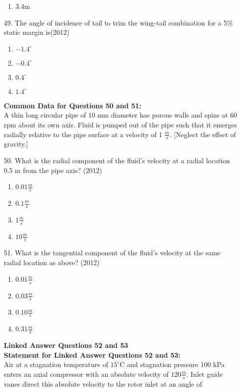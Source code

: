 \documentclass[journal]{IEEEtran}
\begin{document}
\begin{enumerate}
\begin{enumerate}[label=(\Alph*)]
        \item 3.4m
    \end{enumerate}
    \item[49.] The angle of incidence of tail to trim the wing-tail combination for a 5\% static margin is\hfill (2012) 
     \begin{enumerate}[label=(\Alph*)]
        \item $-1.4^{\circ}$
        \item $-0.4^{\circ}$
        \item $0.4^{\circ}$
        \item $1.4^{\circ}$
     \end{enumerate}
     \textbf{Common Data for Questions 50 and 51:}\\
     A thin long circular pipe of 10 mm diameter has porous walls and spins at 60 rpm about its own axis. Fluid
     is pumped out of the pipe such that it emerges radially relative to the pipe surface at a velocity of 1 $\frac{m}{s}$.
     [Neglect the effect of gravity.] 
    \item[50.] What is the radial component of the fluid's velocity at a radial location 0.5 m from the pipe axis? \hfill (2012)
    \begin{enumerate}[label=(\Alph*)]
        \item $0.01\frac{m}{s}$
        \item $0.1\frac{m}{s}$
        \item $1\frac{m}{s}$
        \item $10\frac{m}{s}$
    \end{enumerate}
    \item[51.] What is the tangential component of the fluid's velocity at the same radial location as above? \hfill (2012)
    \begin{enumerate}[label=(\Alph*)]
        \item $0.01\frac{m}{s}$
        \item $0.03\frac{m}{s}$
        \item $0.10\frac{m}{s}$
        \item $0.31\frac{m}{s}$
    \end{enumerate}
    \textbf{Linked Answer Questions 52 and 53}\\
    \textbf{Statement for Linked Answer Questions 52 and 53:}\\
    Air at a stagnation temperature of $15^{\circ}$C and stagnation pressure 100 kPa enters an axial compressor with an
absolute velocity of $120\frac{m}{s}$. Inlet guide vanes direct this absolute velocity to the rotor inlet at an angle of

\end{enumerate}
\end{document}
